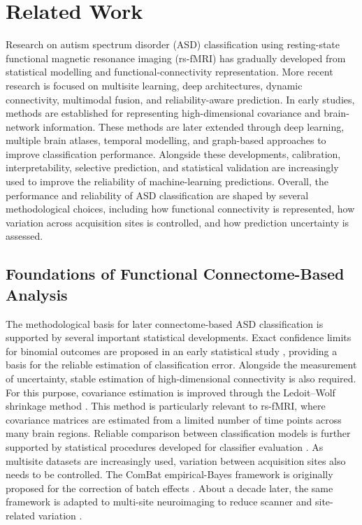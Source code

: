 \section{Related Work}
\label{sec:related}

Research on autism spectrum disorder (ASD) classification using resting-state functional magnetic resonance imaging (rs-fMRI) has gradually developed from statistical modelling and functional-connectivity representation. More recent research is focused on multisite learning, deep architectures, dynamic connectivity, multimodal fusion, and reliability-aware prediction. In early studies, methods are established for representing high-dimensional covariance and brain-network information. These methods are later extended through deep learning, multiple brain atlases, temporal modelling, and graph-based approaches to improve classification performance. Alongside these developments, calibration, interpretability, selective prediction, and statistical validation are increasingly used to improve the reliability of machine-learning predictions. Overall, the performance and reliability of ASD classification are shaped by several methodological choices, including how functional connectivity is represented, how variation across acquisition sites is controlled, and how prediction uncertainty is assessed.

\subsection{Foundations of Functional Connectome-Based Analysis}

The methodological basis for later connectome-based ASD classification is supported by several important statistical developments. Exact confidence limits for binomial outcomes are proposed in an early statistical study \citep{ClopperPearson1934}, providing a basis for the reliable estimation of classification error. Alongside the measurement of uncertainty, stable estimation of high-dimensional connectivity is also required. For this purpose, covariance estimation is improved through the Ledoit--Wolf shrinkage method \citep{LedoitWolf2004}. This method is particularly relevant to rs-fMRI, where covariance matrices are estimated from a limited number of time points across many brain regions. Reliable comparison between classification models is further supported by statistical procedures developed for classifier evaluation \citep{Demsar2006}. As multisite datasets are increasingly used, variation between acquisition sites also needs to be controlled. The ComBat empirical-Bayes framework is originally proposed for the correction of batch effects \citep{Johnsonetal2007}. About a decade later, the same framework is adapted to multi-site neuroimaging to reduce scanner and site-related variation \citep{Fortinetal2018}.


